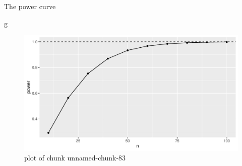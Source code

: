 \documentclass[ignorenonframetext,]{beamer}
\newenvironment{Shaded}{\begin{snugshade}}{\end{snugshade}}
\newcommand{\NormalTok}[1]{#1}
\begin{document}
\begin{frame}[fragile]{The power curve}
\protect\hypertarget{the-power-curve}{}

\begin{Shaded}
\begin{Highlighting}[]
\NormalTok{g}
\end{Highlighting}
\end{Shaded}

\begin{figure}
\centering
\includegraphics{figure/unnamed-chunk-83-1.pdf}
\caption{plot of chunk unnamed-chunk-83}
\end{figure}

\end{frame}
\end{document}
